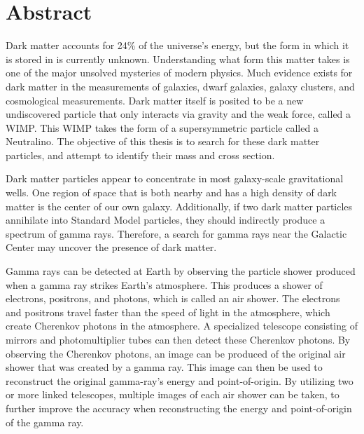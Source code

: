 \cleartooddpage[\thispagestyle{empty}]
\section*{Abstract}

Dark matter accounts for 24\% of the universe's energy, but the form in which it is stored in is currently unknown.
Understanding what form this matter takes is one of the major unsolved mysteries of modern physics.
Much evidence exists for dark matter in the measurements of galaxies, dwarf galaxies, galaxy clusters, and cosmological measurements.
Dark matter itself is posited to be a new undiscovered particle that only interacts via gravity and the weak force, called a WIMP.
This WIMP takes the form of a supersymmetric particle called a Neutralino.
The objective of this thesis is to search for these dark matter particles, and attempt to identify their mass and cross section.

Dark matter particles appear to concentrate in most galaxy-scale gravitational wells.
One region of space that is both nearby and has a high density of dark matter is the center of our own galaxy.
Additionally, if two dark matter particles annihilate into Standard Model particles, they should indirectly produce a spectrum of gamma rays.
Therefore, a search for gamma rays near the Galactic Center may uncover the presence of dark matter.

Gamma rays can be detected at Earth by observing the particle shower produced when a gamma ray strikes Earth's atmosphere.
This produces a shower of electrons, positrons, and photons, which is called an air shower.
The electrons and positrons travel faster than the speed of light in the atmosphere, which create Cherenkov photons in the atmosphere.
A specialized telescope consisting of mirrors and photomultiplier tubes can then detect these Cherenkov photons.
By observing the Cherenkov photons, an image can be produced of the original air shower that was created by a gamma ray.
This image can then be used to reconstruct the original gamma-ray's energy and point-of-origin.
By utilizing two or more linked telescopes, multiple images of each air shower can be taken, to further improve the accuracy when reconstructing the energy and point-of-origin of the gamma ray.

